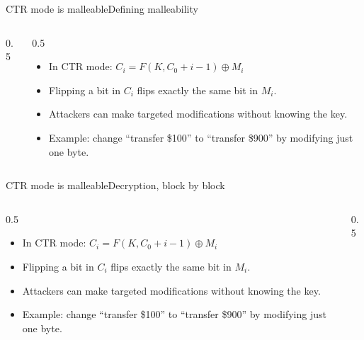 \ifdefined\PRESENTATION\else\PassOptionsToClass{handout}{beamer}\fi\documentclass[aspectratio=169, lualatex]{beamer}
\begin{document}
\begin{frame}{CTR mode is malleable}{Defining malleability}
	\begin{columns}[c]
		\begin{column}{0.5\textwidth}
		\end{column}
		\begin{column}{0.5\textwidth}
			\begin{itemize}
				\item In CTR mode: $C_i = F(K, C_0 + i - 1) \oplus M_i$
				\item Flipping a bit in $C_i$ flips exactly the same bit in $M_i$.
				\item Attackers can make targeted modifications without knowing the key.
				\item Example: change ``transfer \$100'' to ``transfer \$900'' by modifying just one byte.
			\end{itemize}
		\end{column}
	\end{columns}
\end{frame}

\begin{frame}{CTR mode is malleable}{Decryption, block by block}
	\begin{columns}[c]
		\begin{column}{0.5\textwidth}
			\begin{itemize}
				\item In CTR mode: $C_i = F(K, C_0 + i - 1) \oplus M_i$
				\item Flipping a bit in $C_i$ flips exactly the same bit in $M_i$.
				\item Attackers can make targeted modifications without knowing the key.
				\item Example: change ``transfer \$100'' to ``transfer \$900'' by modifying just one byte.
			\end{itemize}
		\end{column}
		\begin{column}{0.5\textwidth}
		\end{column}
	\end{columns}
\end{frame}
\end{document}

